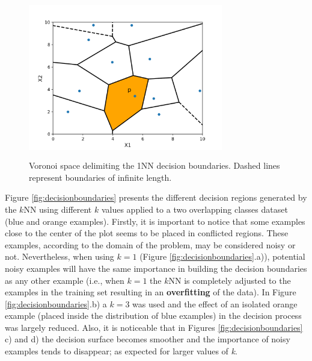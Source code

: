 \begin{figure}[h]
    \centering
    \includegraphics[height = 7cm, width =  8.5cm]{"Part 3 - Learning Systems/Supervised Learning/k-Nearest Neighbors/figures/voronoi2.png"}
    \caption{Voronoi space delimiting the 1NN decision boundaries. Dashed lines represent boundaries of infinite length.}
    \label{fig:voronoi}
\end{figure}

Figure \ref{fig:decisionboundaries} presents the different decision regions generated by the $k$NN using different $k$ values applied to a two overlapping classes dataset (blue and orange examples). Firstly, it is important to notice that some examples close to the center of the plot seems to be placed in conflicted regions. These examples, according to the domain of the problem, may be considered noisy or not. Nevertheless, when using $k = 1$ (Figure \ref{fig:decisionboundaries}.a)), potential noisy examples will have the same importance in building the decision boundaries as any other example (i.e., when $k = 1$ the $k$NN is completely adjusted to the examples in the training set resulting in an \textbf{overfitting} of the data). In Figure \ref{fig:decisionboundaries}.b) a $k = 3$ was used and the effect of an isolated orange example (placed inside the distribution of blue examples) in the decision process was largely reduced. Also, it is noticeable that in Figures \ref{fig:decisionboundaries} c) and d) the decision surface becomes smoother and the importance of noisy examples tends to disappear; as expected for larger values of \textit{k}. 

